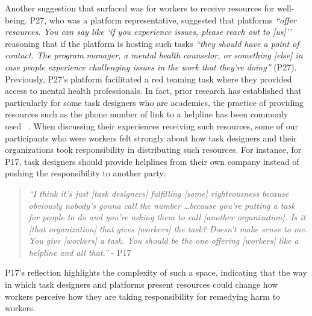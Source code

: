Another suggestion that surfaced was for workers to receive resources for well-being. P27, who was a platform representative, suggested that platforms \textit{``offer resources. You can say like `if you experience issues, please reach out to [us]''} reasoning that if the platform is hosting such tasks \textit{``they should have a point of contact. The program manager, a mental health counselor, or something [else] in case people experience challenging issues in the work that they're doing''} (P27). Previously, P27's platform facilitated a red teaming task where they provided access to mental health professionals. In fact, prior research has established that particularly for some task designers who are academics, the practice of providing resources such as the phone number of link to a helpline has been commonly used~\cite{qian2025locating} . When discussing their experiences receiving such resources, some of our participants who were workers felt strongly about how task designers and their organizations took responsibility in distributing such resources. For instance, for P17, task designers should provide helplines from their own company instead of pushing the responsibility to another party:
\begin{quote}
    \textit{``I think it's just [task designers] fulfilling [some] righteousness because obviously nobody's gonna call the number \dots because you're putting a task for people to do and you're asking them to call [another organization]. Is it [that organization] that gives [workers] the task? Doesn't make sense to me. You give [workers] a task. You should be the one offering [workers] like a helpline and all that.''} - P17
\end{quote}
P17's reflection highlights the complexity of such a space, indicating that the way in which task designers and platforms present resources could change how workers perceive how they are taking responsibility for remedying harm to workers. 
